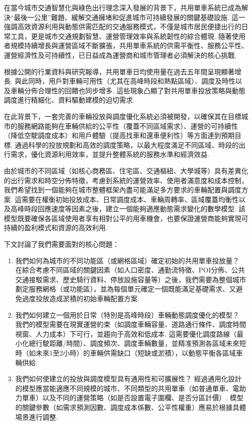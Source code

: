 在當今城市交通智慧化與綠色出行理念深入發展的背景下，共用單車系統已成為解決“最後一公里”難題、緩解交通擁堵和促進城市可持續發展的關鍵基礎設施. 這一強調高效資源利用與動態供需匹配的交通服務模式，不僅是城市居民便捷出行的日常工具，更是城市交通規劃智慧、運營管理效率與系統韌性的綜合體現. 隨著使用者規模持續增長與運營區域不斷擴張，共用單車系統的供需平衡性、服務公平性、運營經濟性及可持續性，已日益成為運營商和城市管理者必須解決的核心挑戰. 

根據公開的行業資料與研究報導，共用單車日均使用量在過去五年間呈現顯著增長. 與此同時，用戶對車輛可用性（尤其在高峰時段和熱點區域）、調度及時性以及車輛分佈合理性的回饋也同步增多. 這些現象凸顯了對共用單車投放策略與動態調度進行精細化、資料驅動建模的迫切需求. 

在此背景下，一套完善的車輛投放與調度優化系統必須被開發，以確保其在目標城市的服務網路能夠在車輛供給的公平性（覆蓋不同區域需求）、運營的可持續性（降低空駛調度成本）和用戶體驗（提高找車和還車便利性）等方面達到預期目標. 通過科學的投放規劃和高效的調度策略，以最大程度滿足不同區域、時段的出行需求，優化資源利用效率，並提升整體系統的服務水準和經濟效益. 

由於城市的不同區域（如核心商務區、住宅區、交通樞紐、大學城等）具有差異化的出行需求和時空分佈特徵，考慮到系統的運營效率、使用者滿意度和成本控制，我們希望找到一個能夠在城市整體框架內盡可能滿足多方要求的車輛配置與調度方案. 這需要在權衡初始投放成本、日常調度成本、車輛周轉率、區域覆蓋均衡性以及高峰時段回應速度等因素之後，建立一個能夠適應動態需求變化的數學模型. 該模型既要確保各區域使用者享有相對公平的用車機會，也要保證運營商能夠實現可持續的盈利模式和資源的高效利用. 

下文討論了我們需要面對的核心問題：
\begin{enumerate}
    \item 我們如何為城市的不同功能區（或網格區域）確定初始的共用單車投放量？
    在綜合考慮不同區域的關鍵因素（如人口密度、通勤流特徵、POI分佈、公共交通接駁需求、歷史騎行資料、停放設施容量等）之後，我們需要為整個城市劃定服務網格（或功能區），並為每個單元確定一個既能滿足基礎需求、又避免過度投放造成淤積的初始車輛配置方案. 
    \item 我們如何建立一個用於日常（特別是高峰時段）車輛動態調度優化的模型？
    我們的模型需要在現實運營約束（如調度車輛容量、道路通行條件、調度時間視窗、人力成本）下可行，並趨向于高效和低成本. 這需要優化調度路線（最小化總行駛距離/時間）、調度頻次、調度車輛數量，並精准預測各區域未來短時（如未來1至2小時）的車輛供需缺口（短缺或淤積），以動態平衡各區域車輛供給. 
    \item 我們如何使建立的投放與調度模型具有通用性和可擴展性？
    經過通用化設計的模型應當能適應不同規模的城市、不同類型的共用單車（如普通單車、電助力單車）以及不同的運營策略（如是否設置電子圍欄、是否分區計價）. 模型的關鍵參數（如需求預測因數、調度成本係數、公平性權重）應易於根據具體場景進行調整. 
\end{enumerate}


